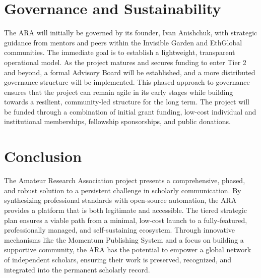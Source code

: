 \documentclass[conference, compsoc, 11pt]{IEEEtran}
\begin{document}
\section{Governance and Sustainability}

The ARA will initially be governed by its founder, Ivan Anishchuk, with strategic guidance from mentors and peers within the Invisible Garden and EthGlobal communities. The immediate goal is to establish a lightweight, transparent operational model. As the project matures and secures funding to enter Tier 2 and beyond, a formal Advisory Board will be established, and a more distributed governance structure will be implemented. This phased approach to governance ensures that the project can remain agile in its early stages while building towards a resilient, community-led structure for the long term. The project will be funded through a combination of initial grant funding, low-cost individual and institutional memberships, fellowship sponsorships, and public donations.

\section{Conclusion}

The Amateur Research Association project presents a comprehensive, phased, and robust solution to a persistent challenge in scholarly communication. By synthesizing professional standards with open-source automation, the ARA provides a platform that is both legitimate and accessible. The tiered strategic plan ensures a viable path from a minimal, low-cost launch to a fully-featured, professionally managed, and self-sustaining ecosystem. Through innovative mechanisms like the Momentum Publishing System and a focus on building a supportive community, the ARA has the potential to empower a global network of independent scholars, ensuring their work is preserved, recognized, and integrated into the permanent scholarly record.
\end{document}

